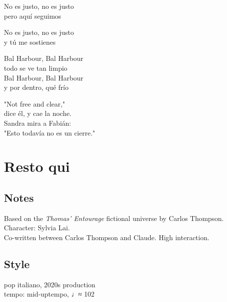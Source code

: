 \begin{lyrics}
No es justo, no es justo\\
pero aquí seguimos

No es justo, no es justo\\
y tú me sostienes

Bal Harbour, Bal Harbour\\
todo se ve tan limpio\\
Bal Harbour, Bal Harbour\\
y por dentro, qué frío

"Not free and clear,"\\
dice él, y cae la noche.\\
Sandra mira a Fabián:\\
"Esto todavía no es un cierre."

\end{lyrics}

\section{Resto qui}

\subsection{Notes}
Based on the \emph{Thomas' Entourage} fictional universe by Carlos Thompson.\\
Character: Sylvia Lai.\\
Co-written between Carlos Thompson and Claude. High interaction.

\subsection{Style}
pop italiano, 2020s production\\
tempo: mid-uptempo, ♩≈ 102

